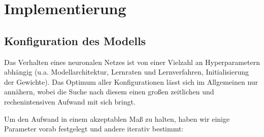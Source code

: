 \documentclass[
12pt, %
toc=listofnumbered, %
toc=chapterentrydotfill, %
numbers=noenddot, %
captions=tableheading, %
bibliography=numbered
]{scrreprt}
\let\Oldsection\section
\renewcommand{\section}{\FloatBarrier\Oldsection}
\begin{document}
\chapter{Implementierung}

\section{Konfiguration des Modells}

Das Verhalten eines neuronalen Netzes ist von einer Vielzahl an Hyperparametern abhängig (u.a. Modellarchitektur, Lernraten und Lernverfahren, Initialisierung der Gewichte). Das Optimum aller Konfigurationen lässt sich im Allgemeinen nur annähern, wobei die Suche nach diesem einen großen zeitlichen und rechenintensiven Aufwand mit sich bringt.

Um den Aufwand in einem akzeptablen Maß zu halten, haben wir einige Parameter vorab festgelegt und andere iterativ bestimmt:
\end{document}
